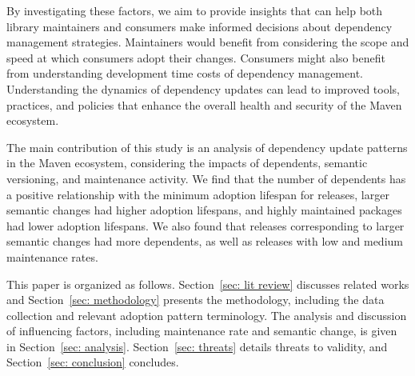 \documentclass[conference]{IEEEtran}
\begin{document}
By investigating these factors, we aim to provide insights that can help both library maintainers and consumers make informed decisions about dependency management strategies. Maintainers would benefit from considering the scope and speed at which consumers adopt their changes. Consumers might also benefit from understanding development time costs of dependency management. Understanding the dynamics of dependency updates can lead to improved tools, practices, and policies that enhance the overall health and security of the Maven ecosystem.

The main contribution of this study is an analysis of dependency update patterns in the Maven ecosystem, considering the impacts of dependents, semantic versioning, and maintenance activity. We find that the number of dependents has a positive relationship with the minimum adoption lifespan for releases, larger semantic changes had higher adoption lifespans, and highly maintained packages had lower adoption lifespans. We also found that releases corresponding to larger semantic changes had more dependents, as well as releases with low and medium maintenance rates.

This paper is organized as follows.
Section~\ref{sec: lit review} discusses related works and Section~\ref{sec: methodology} presents the methodology, including the data collection and relevant adoption pattern terminology. The analysis and discussion of influencing factors, including maintenance rate and semantic change, is given in Section~\ref{sec: analysis}. Section~\ref{sec: threats} details threats to validity, and Section~\ref{sec: conclusion} concludes.
%
\end{document}
